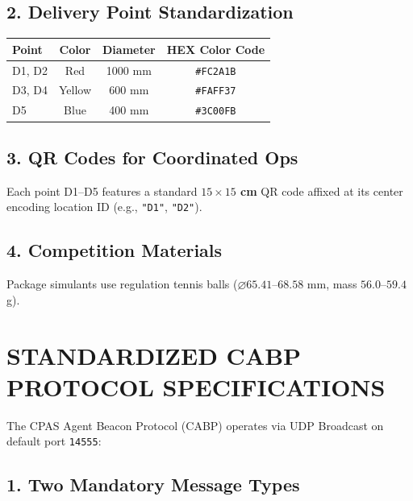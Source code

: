 \documentclass[12pt,a4paper]{article}
\begin{document}
\subsection*{2. Delivery Point Standardization}
\begin{center}
\begin{tabular}{lccc}
\toprule
\textbf{Point} & \textbf{Color} & \textbf{Diameter} & \textbf{HEX Color Code} \\
\midrule
D1, D2 & Red & 1000 mm & \texttt{\#FC2A1B} \\
D3, D4 & Yellow & 600 mm & \texttt{\#FAFF37} \\
D5 & Blue & 400 mm & \texttt{\#3C00FB} \\
\bottomrule
\end{tabular}
\end{center}

\subsection*{3. QR Codes for Coordinated Ops}
Each point D1–D5 features a standard \textbf{$15 \times 15$ cm} QR code affixed at its center encoding location ID (e.g., \texttt{"D1"}, \texttt{"D2"}).

\subsection*{4. Competition Materials}
Package simulants use regulation tennis balls ($\varnothing 65.41$–$68.58$ mm, mass $56.0$–$59.4$ g).

\section{STANDARDIZED CABP PROTOCOL SPECIFICATIONS}

The CPAS Agent Beacon Protocol (CABP) operates via UDP Broadcast on default port \texttt{14555}:

\subsection*{1. Two Mandatory Message Types}
\end{document}
